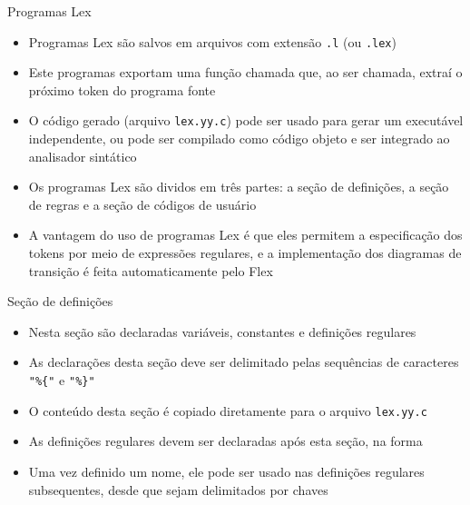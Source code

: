 \begin{frame}[fragile]{Programas Lex}

    \begin{itemize}
        \item Programas Lex são salvos em arquivos com extensão \texttt{.l} (ou \texttt{.lex})

        \item Este programas exportam uma função chamada  que, ao ser chamada, extraí o próximo token do programa fonte

        \item O código gerado (arquivo \texttt{lex.yy.c}) pode ser usado para gerar um executável independente, ou pode ser compilado como código objeto e ser
            integrado ao analisador sintático

        \item Os programas Lex são dividos em três partes: a seção de definições, a seção de regras e a seção de códigos de usuário

        \item A vantagem do uso de programas Lex é que eles permitem a especificação dos tokens por meio de expressões regulares, e a implementação dos
            diagramas de transição é feita automaticamente pelo Flex
    \end{itemize}

\end{frame}

\begin{frame}[fragile]{Seção de definições}

    \begin{itemize}
        \item Nesta seção são declaradas variáveis, constantes e definições regulares

        \item As declarações desta seção deve ser delimitado pelas sequências de caracteres \verb|"%{"| 
            e \verb|"%}"|

        \item O conteúdo desta seção é copiado diretamente para o arquivo \texttt{lex.yy.c}

        \item As definições regulares devem ser declaradas após esta seção, na forma

        \item Uma vez definido um nome, ele pode ser usado nas definições regulares subsequentes, desde que sejam delimitados por chaves
    \end{itemize}

\end{frame}

